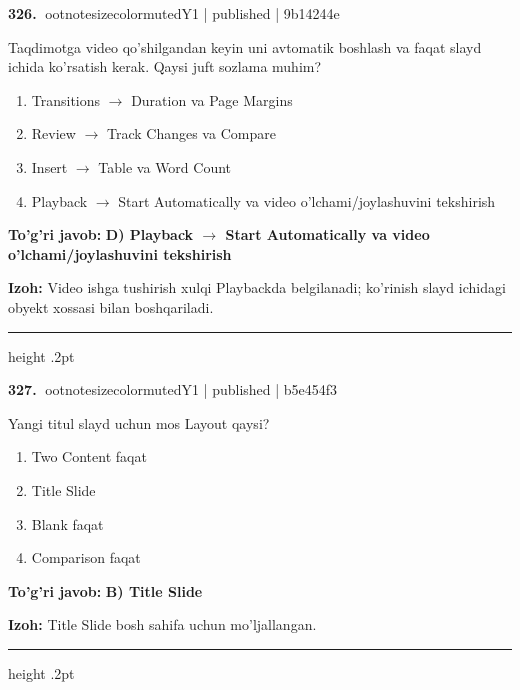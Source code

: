 \documentclass[10pt,a4paper]{article}
\begin{document}
\textbf{\color{ink}326.} {ootnotesizecolor{muted}Y1 | published | 9b14244e}
\par
Taqdimotga video qo'shilgandan keyin uni avtomatik boshlash va faqat slayd ichida ko'rsatish kerak. Qaysi juft sozlama muhim?
\begin{enumerate}[label=\Alph*),leftmargin=9mm]
\item Transitions \ensuremath{\rightarrow} Duration va Page Margins
\item Review \ensuremath{\rightarrow} Track Changes va Compare
\item Insert \ensuremath{\rightarrow} Table va Word Count
\item Playback \ensuremath{\rightarrow} Start Automatically va video o'lchami/joylashuvini tekshirish
\end{enumerate}
\begin{tcolorbox}[enhanced,breakable,colback=teal!4,colframe=teal!55!black,boxrule=0.45pt,arc=1.2mm,left=2.8mm,right=2.8mm,top=2mm,bottom=2mm]
\textbf{\color{teal}To'g'ri javob:} \textbf{D) Playback \ensuremath{\rightarrow} Start Automatically va video o'lchami/joylashuvini tekshirish}
\par\smallskip
\textbf{Izoh:} Video ishga tushirish xulqi Playbackda belgilanadi; ko'rinish slayd ichidagi obyekt xossasi bilan boshqariladi.
\end{tcolorbox}
\vspace{2mm}\hrule height .2pt\vspace{2mm}

\textbf{\color{ink}327.} {ootnotesizecolor{muted}Y1 | published | b5e454f3}
\par
Yangi titul slayd uchun mos Layout qaysi?
\begin{enumerate}[label=\Alph*),leftmargin=9mm]
\item Two Content faqat
\item Title Slide
\item Blank faqat
\item Comparison faqat
\end{enumerate}
\begin{tcolorbox}[enhanced,breakable,colback=teal!4,colframe=teal!55!black,boxrule=0.45pt,arc=1.2mm,left=2.8mm,right=2.8mm,top=2mm,bottom=2mm]
\textbf{\color{teal}To'g'ri javob:} \textbf{B) Title Slide}
\par\smallskip
\textbf{Izoh:} Title Slide bosh sahifa uchun mo'ljallangan.
\end{tcolorbox}
\vspace{2mm}\hrule height .2pt\vspace{2mm}
\end{document}

